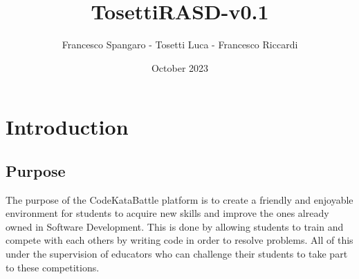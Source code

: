 \documentclass{article}
\title{TosettiRASD-v0.1}
\author{Francesco Spangaro - Tosetti Luca - Francesco Riccardi}
\date{October 2023}
\begin{document}
\maketitle

\begin{figure}[h]
    \centering
\end{figure}



\tableofcontents

\newpage

\pagestyle{IntroductionStyle}

\section{Introduction}
    \subsection{Purpose}
        The purpose of the CodeKataBattle platform is to create a friendly and enjoyable environment for students
        to acquire new skills and improve the ones already owned in Software Development. This is done by allowing students to train and compete with each others by writing code in order to resolve problems. All of this under the supervision of educators who can challenge their students to take part to these competitions.
\end{document}
